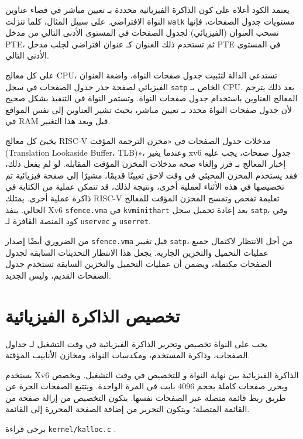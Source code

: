 يعتمد الكود أعلاه على كون الذاكرة الفيزيائية محددة بـ تعيين مباشر في فضاء عناوين النواة الافتراضي.
على سبيل المثال، كلما تنزلت \lstinline{walk} مستويات جدول الصفحات، فإنها تسحب العنوان (الفيزيائي) لجدول الصفحات في المستوى الأدنى التالي من مدخل PTE،
ثم تستخدم ذلك العنوان كـ عنوان افتراضي لجلب مدخل PTE في المستوى الأدنى التالي.

على كل معالج CPU، تستدعي  الدالة  لتثبيت جدول صفحات النواة،
واضعة العنوان الفيزيائي لصفحة جذر جدول الصفحات في سجل \texttt{satp} الخاص بـ CPU.
بعد ذلك يترجم المعالج العناوين باستخدام جدول صفحات النواة.
وتستمر النواة في التنفيذ بشكل صحيح لأن جدول صفحات النواة محدد بـ تعيين مباشر، بحيث تشير العناوين إلى نفس المواقع في RAM قبل وبعد هذا التغيير.

يخبئ كل معالج RISC-V مدخلات جدول الصفحات في «مخزن الترجمة المؤقت (Translation Lookaside Buffer، TLB)»، وعندما يغير xv6 جدول صفحات، يجب عليه إخبار المعالج بـ فرز وإلغاء صحة مدخلات المخزن المؤقت المقابلة.
لو لم يفعل ذلك، فقد يستخدم المخزن المخبئي في وقت لاحق تعيينًا قديمًا، مشيرًا إلى صفحة فيزيائية تم تخصيصها في هذه الأثناء لعملية أخرى، ونتيجة لذلك، قد تتمكن عملية من الكتابة في ذاكرة عملية أخرى.
يمتلك RISC-V تعليمة  تفحص وتمسح المخزن المؤقت للمعالج الحالي.
ينفذ Xv6 {\tt sfence.vma} في {\tt kvminithart} بعد إعادة تحميل سجل \texttt{satp}، وفي كود المنصة القافزة لـ \lstinline{uservec} و \lstinline{userret}.

من الضروري أيضًا إصدار \texttt{sfence.vma} قبل تغيير \texttt{satp}، من أجل الانتظار لاكتمال جميع عمليات التحميل والتخزين الجارية.
يجعل هذا الانتظار التحديثات السابقة لجدول الصفحات مكتملة، ويضمن أن عمليات التحميل والتخزين السابقة تستخدم جدول الصفحات القديم، وليس الجديد.

\section{تخصيص الذاكرة الفيزيائية}
\label{sec:physical_memory_allocation}

يجب على النواة تخصيص وتحرير الذاكرة الفيزيائية في وقت التشغيل لـ جداول الصفحات، وذاكرة المستخدم، ومكدسات النواة، ومخازن الأنابيب المؤقتة.

يستخدم Xv6 الذاكرة الفيزيائية بين نهاية النواة و  للتخصيص في وقت التشغيل.
ويخصص ويحرر صفحات كاملة بحجم 4096 بايت في المرة الواحدة.
ويتتبع الصفحات الحرة عن طريق ربط قائمة متصلة عبر الصفحات نفسها.
يتكون التخصيص من إزالة صفحة من القائمة المتصلة؛ ويتكون التحرير من إضافة الصفحة المحررة إلى القائمة.

يرجى قراءة \lstinline{kernel/kalloc.c} .

